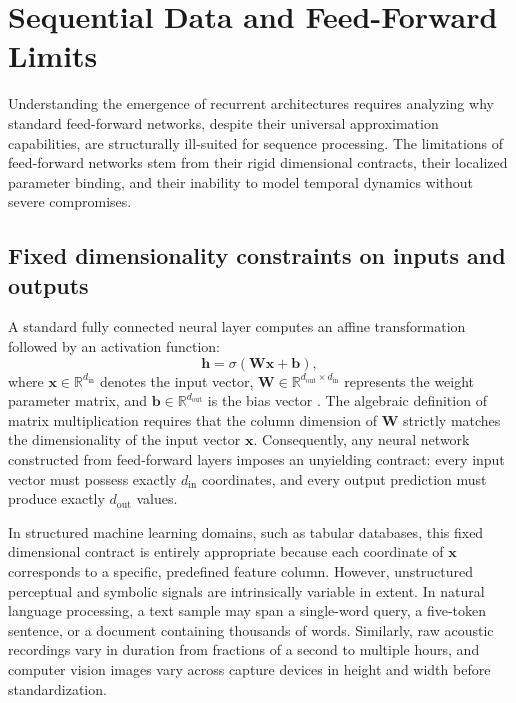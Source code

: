 \documentclass[../../../main.tex]{subfiles}
\begin{document}
\clearpage
\section{Sequential Data and Feed-Forward Limits}
\label{sec:rnn_limitations_fcn}

Understanding the emergence of recurrent architectures requires analyzing why standard feed-forward networks, despite their universal approximation capabilities, are structurally ill-suited for sequence processing. The limitations of feed-forward networks stem from their rigid dimensional contracts, their localized parameter binding, and their inability to model temporal dynamics without severe compromises.

\subsection{Fixed dimensionality constraints on inputs and outputs}
\label{subsec:rnn_fixed_dimensions}

A standard fully connected neural layer computes an affine transformation followed by an activation function:
\begin{equation}
\mathbf{h} = \sigma\left(\mathbf{W} \mathbf{x} + \mathbf{b}\right),
\label{eq:fcn_layer_definition}
\end{equation}
where $\mathbf{x} \in \mathbb{R}^{d_{\text{in}}}$ denotes the input vector, $\mathbf{W} \in \mathbb{R}^{d_{\text{out}} \times d_{\text{in}}}$ represents the weight parameter matrix, and $\mathbf{b} \in \mathbb{R}^{d_{\text{out}}}$ is the bias vector \citep{goodfellow2016}. The algebraic definition of matrix multiplication requires that the column dimension of $\mathbf{W}$ strictly matches the dimensionality of the input vector $\mathbf{x}$. Consequently, any neural network constructed from feed-forward layers imposes an unyielding contract: every input vector must possess exactly $d_{\text{in}}$ coordinates, and every output prediction must produce exactly $d_{\text{out}}$ values.

In structured machine learning domains, such as tabular databases, this fixed dimensional contract is entirely appropriate because each coordinate of $\mathbf{x}$ corresponds to a specific, predefined feature column. However, unstructured perceptual and symbolic signals are intrinsically variable in extent. In natural language processing, a text sample may span a single-word query, a five-token sentence, or a document containing thousands of words. Similarly, raw acoustic recordings vary in duration from fractions of a second to multiple hours, and computer vision images vary across capture devices in height and width before standardization.
\end{document}
